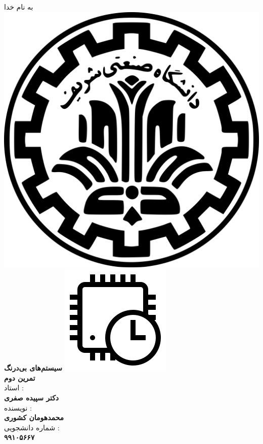 \begin{center}
    به نام خدا
    \\
    \includegraphics[scale=0.02]{commons/sharif.png}
    \\
    \vspace*{5mm}
    \textbf{\Huge{سیستم‌های بی‌درنگ}}
    \hspace*{1mm}
    \vspace*{5mm}
    \includegraphics[scale=0.15]{commons/course.png}
    \\
    \vspace*{5mm}
    \textbf{تمرین دوم}
    \\
    \vspace*{7mm}
    استاد :
    \\
    \vspace*{2mm}
    \textbf{\Large{دکتر سپیده صفری}}
    \\
    \vspace*{7mm}
    نویسنده :
    \\
    \vspace*{2mm}
    \textbf{\Large{محمدهومان کشوری}}
    \\
    \vspace*{7mm}
    شماره دانشجویی :
    \\
    \vspace*{2mm}
    \textbf{\Large{۹۹۱۰۵۶۶۷}}
\end{center}